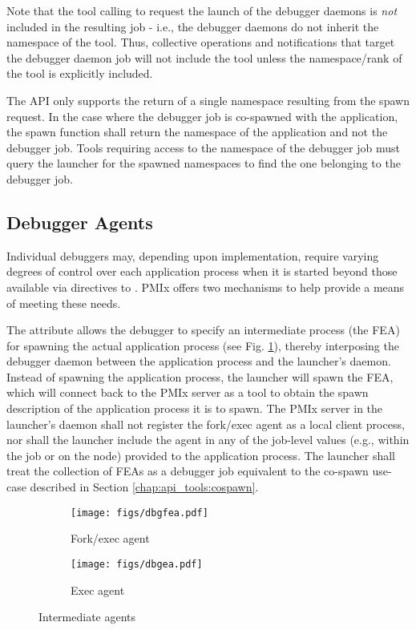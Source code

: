 \adviceuserstart
Note that the tool calling  to request the launch of the debugger daemons is \emph{not} included in the resulting job - i.e., the debugger daemons do not inherit the namespace of the tool. Thus, collective operations and notifications that target the debugger daemon job will not include the tool unless the namespace/rank of the tool is explicitly included.

The  \ac{API} only supports the return of a single namespace resulting from the spawn request. In the case where the debugger job is co-spawned with the application, the spawn function shall return the namespace of the application and not the debugger job. Tools requiring access to the namespace of the debugger job must query the launcher for the spawned namespaces to find the one belonging to the debugger job.
\adviceuserend

\subsection{Debugger Agents}
\label{api:tools:debugger:agent}

Individual debuggers may, depending upon implementation, require varying degrees of control over each application process when it is started beyond those available via directives to . \ac{PMIx} offers two mechanisms to help provide a means of meeting these needs.

The  attribute allows the debugger to specify an intermediate process (the \ac{FEA}) for spawning the actual application process (see Fig. \ref{fig:dbgfea}), thereby interposing the debugger daemon between the application process and the launcher's daemon. Instead of spawning the application process, the launcher will spawn the \ac{FEA}, which will connect back to the \ac{PMIx} server as a tool to obtain the spawn description of the application process it is to spawn. The \ac{PMIx} server in the launcher's daemon shall not register the fork/exec agent as a local client process, nor shall the launcher include the agent in any of the job-level values (e.g.,  within the job or  on the node) provided to the application process. The launcher shall treat the collection of \acp{FEA} as a debugger job equivalent to the co-spawn use-case described in Section \ref{chap:api_tools:cospawn}.

\begin{figure*}[ht!]
\centering
\begin{subfigure}{.5\textwidth}
  \centering
  \texttt{[image: figs/dbgfea.pdf]}
  \caption{Fork/exec agent}
  \label{fig:dbgfea}
\end{subfigure}%
\begin{subfigure}{.5\textwidth}
  \centering
  \texttt{[image: figs/dbgea.pdf]}
  \caption{Exec agent}
  \label{fig:dbgea}
\end{subfigure}
\caption{Intermediate agents}
\label{fig:dbginta}
\end{figure*}

